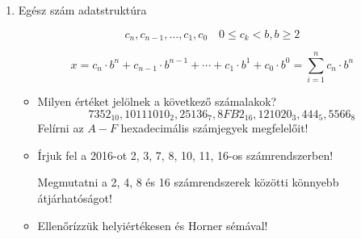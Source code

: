 \documentclass[a4paper]{article}
\newenvironment{solution}
{\color{RoyalBlue}}{\bigskip}
\begin{document}
\begin{enumerate}
\begin{itemize}
	\item Egészrész függvény:
		$\lceil 8.1 \rceil$,
		$\lfloor 0.2 \rfloor$,
		$\left\lfloor \dfrac{52}{7} \right\rfloor$,
		$\lfloor -6.5 \rfloor$,
		$\lceil -7.51 \rceil$
	\item Kerekítő függvény:
		$\text{Round}(8.1)$,
		$\text{Round}(0.2)$,
		$\text{Round}\left( \left\lfloor \dfrac{52}{7} \right\rfloor \right)$,
		$\text{Round}(-6.5)$,
		$\text{Round}(-7.51)$
	\item Törtrész függvény:
		$\{ 8.1 \}$,
		$\{ 0.2 \}$,
		$\left\{ \dfrac{52}{7} \right\}$,
		$\{ -6.5 \}$,
		$\{ -7.51 \}$
	\item Egész hányados képzése, div művelet:
		27 div 5, 12 div 0, 21 div -9, -11 div 3, -20 div -7
	\item Egész maradék képzése, mod művelet:
		27 mod 5, 12 mod 0, 21 mod -9, -11 mod 3, -20 mod -7
\end{itemize}

\begin{solution}
Elegendő visszahelyettesíteni a definíciókba.
\end{solution}

Megnézni az előjeles és előjel nélküli változatok eredményeit, például $31 \div 7$ és $31 \mod 7$ esetén!

\item

Egész szám adatstruktúra

$$
c_n, c_{n-1}, \ldots, c_1, c_0 \quad 0 \leq c_k < b, b \geq 2
$$

$$
x = c_n \cdot b^n + c_{n-1} \cdot b^{n-1} + \cdots + c_1 \cdot b^1 + c_0 \cdot b^0 = \sum_{i=1}^n c_n \cdot b^n
$$

\begin{itemize}
	\item Milyen értéket jelölnek a következő számalakok?
$$
7352_{10}, 10111010_{2}, 25136_{7}, 8FB2_{16}, 121020_{3}, 444_{5}, 5566_{8}
$$
\begin{solution}
Felírni az $A-F$ hexadecimális számjegyek megfelelőit!
\end{solution}
	\item Írjuk fel a 2016-ot 2, 3, 7, 8, 10, 11, 16-os számrendszerben!
	
\begin{solution}
Megmutatni a 2, 4, 8 és 16 számrendszerek közötti könnyebb átjárhatóságot!
\end{solution}

	\item Ellenőrízzük helyiértékesen és Horner sémával!
\end{itemize}


\end{enumerate}
\end{document}
